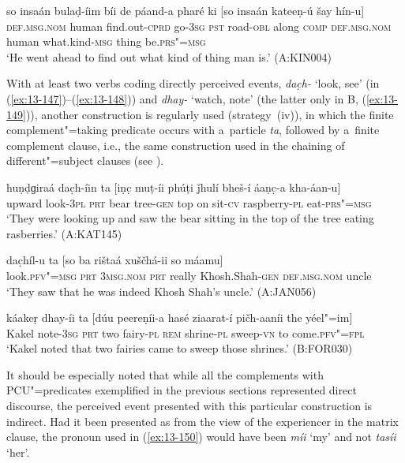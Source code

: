 \begin{exe}
\ex
\label{ex:13-146}
\gll so insaán bulaḍ-íim bíi de páand-a  pharé ki [so insaán kateeṇ-ú
  šay  hín-u] \\
\textsc{def.msg.nom} human find.out-\textsc{cprd} go-\textsc{3sg} \textsc{pst} road-\textsc{obl}  along \textsc{comp} \textsc{def.msg.nom} human what.kind-\textsc{msg} thing be.\textsc{prs"=msg} \\
\glt `He went ahead to find out what kind of thing man is.' (A:KIN004) 
\end{exe}

 With at least two verbs coding directly perceived events, \textit{dac̣h-} `look, see' (in (\ref{ex:13-147})--(\ref{ex:13-148})) and \textit{dhay-} `watch, note' (the latter only in B, (\ref{ex:13-149})), another construction is regularly used (strategy~(iv)), in which the finite complement"=taking predicate occurs with a~particle \textit{ta}, followed by a~finite complement clause, i.e., the same construction used in the chaining of different"=subject clauses (see ). 

\begin{exe}
\ex
\label{ex:13-147}
\gll huṇḍɡiraá dac̣h-íin ta [iṇc̣ muṭ-íi phúṭi ǰhulí  bheš-í áaṇc̣-a kha-áan-u] \\
upward look-\textsc{3pl} \textsc{prt} bear tree-\textsc{gen} top on sit-\textsc{cv} raspberry-\textsc{pl} eat-\textsc{prs"=msg}  \\
\glt `They were looking up and saw the bear sitting in the top of the tree eating rasberries.' (A:KAT145)

\ex
\label{ex:13-148}
\gll dac̣híl-u ta [so ba rištaá  xuščhá-ii so máamu] \\
look.\textsc{pfv"=msg} \textsc{prt} \textsc{3msg.nom} \textsc{prt} really Khosh.Shah-\textsc{gen} \textsc{def.msg.nom} uncle  \\
\glt `They saw that he was indeed Khosh Shah's uncle.' (A:JAN056)

\ex
\label{ex:13-149}
\gll káakeṛ dhay-íi ta [dúu peereṇíi-a hasé ziaarat-í  pičh-aaníi the yéel"=im] \\
Kakel note-\textsc{3sg} \textsc{prt} two fairy-\textsc{pl}  \textsc{rem} shrine-\textsc{pl} sweep-\textsc{vn} to come.\textsc{pfv"=fpl} \\
\glt `Kakel noted that two fairies came to sweep those shrines.' (B:FOR030) 
\end{exe}

It should be especially noted that while all the complements with PCU"=predicates exemplified in the previous sections represented direct discourse, the perceived event presented with this particular construction is indirect. Had it been presented as from the view of the experiencer in the matrix clause, the pronoun used in (\ref{ex:13-150}) would have been \textit{míi} `my' and not \textit{tasíi} `her'.

